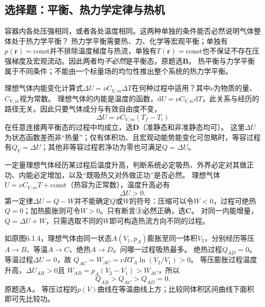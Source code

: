 
\subsection{选择题：平衡、热力学定律与热机}

\problemtext 容器内各处压强相同，或者各处温度相同。这两种单独的条件能否必然说明气体整体处于热力学平衡？
\workings
热力学平衡需要热、力、化学等宏观平衡；单独有$p(\bm r)=\mathrm{const}$并不排除温度梯度与热流，单独有$T(\bm r)=\mathrm{const}$也不保证不存在压强梯度及宏观流动。因此两者均\emph{不必然}是平衡态，原题选\textbf{B}。
\crosscheck 热平衡与力学平衡属于不同条件；不能由一个标量场的均匀性推出整个系统的热力学平衡。

\problemtext 理想气体内能变化计算式$\Delta U=\nu C_{V,m}\Delta T$在何种过程中适用？其中$\nu$为物质的量、$C_{V,m}$视为常数。
\workings
理想气体的内能是温度的函数，$\mathrm dU=\nu C_{V,m}\mathrm dT$，此关系与经历的路径无关。因此只要气体成分与有效自由度不变，
\[
\boxed{\Delta U=\nu C_{V,m}(T_f-T_i)}
\]
在任意连接两平衡态的过程中均成立，选\textbf{D}（准静态和非准静态均可）。
\crosscheck 这里$\Delta U$为状态函数差而非“热量”；仅有体积功、且宏观动能势能变化可忽略时，等容过程有$Q_V=\Delta U$；其他非等容过程若净功为零也可满足$Q=\Delta U$。

\problemtext 一定量理想气体经历某过程后温度升高，判断系统必定吸热、外界必定对其做正功、内能必定增加，以及“既吸热又对外做正功”是否必然。
\workings
理想气体$U=\nu C_{V,m}T+\mathrm{const}$（热容为正常数），温度升高必有
\[
\boxed{\Delta U>0}.
\]
第一定律$\Delta U=Q-W$并不能确定$Q$或$W$的符号：压缩可以令$W<0$，过程可绝热$Q=0$；加热膨胀则可令$W>0$。只有断言③必然正确，选\textbf{C}。
\crosscheck 对同一内能增量，$Q=\Delta U+W$，只需选取不同的$W$即可构造热流方向不同的过程。

\problemtext 如原图6.1.4，理想气体由同一状态$A(V_1,p_A)$膨胀至同一体积$V_2$，分别经历等压$A\to B$、等温$A\to C$、绝热$A\to D$。问哪一过程吸热最多。
\workings
绝热过程$Q_{AD}=0$。等温过程$\Delta U=0$，故
$Q_{AC}=W_{AC}=\nu RT_A\ln(V_2/V_1)>0$。
等压膨胀过程温度升高，$\Delta U_{AB}>0$且
$W_{AB}=p_A(V_2-V_1)>W_{AC}$，所以
\[
\boxed{Q_{AB}>Q_{AC}>Q_{AD}=0}.
\]
原题选\textbf{A}。
\crosscheck 等压过程的$p(V)$曲线在等温曲线上方；比较同体积区间曲线下面积即可先比较功。

